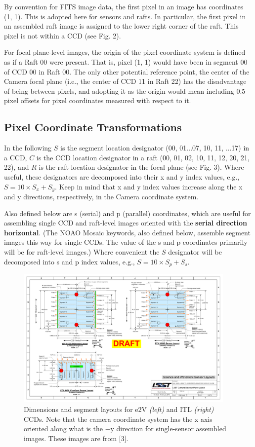 \documentclass{article}[12pt]
\begin{document}
By convention for FITS image data, the first pixel in an image has coordinates (1, 1).  This is adopted here for sensors and rafts.  In particular, the first pixel in an assembled raft image is assigned to the lower right corner of the raft.  This pixel is not within a CCD (see Fig. 2). 

For focal plane-level images, the origin of the pixel coordinate system is defined as if a Raft 00 were present.  That is, pixel (1, 1) would have been in segment 00 of CCD 00 in Raft 00.  The only other potential reference point, the center of the Camera focal plane (i.e., the center of CCD 11 in Raft 22) has the disadvantage of being between pixels, and adopting it as the origin would mean including 0.5 pixel offsets for pixel coordinates measured with respect to it.

\subsection{Pixel Coordinate Transformations}
In the following $S$ is the segment location designator (00, 01...07, 10, 11, ...17) in a CCD, $C$ is the CCD location designator in a raft (00, 01, 02, 10, 11, 12, 20, 21, 22), and $R$ is the raft location designator in the focal plane (see Fig. 3).  Where useful, these designators are decomposed into their x and y index values, e.g., $S = 10 \times S_x + S_y$.  Keep in mind that x and y index values increase along the x and y directions, respectively, in the Camera coordinate system.

Also defined below are s (serial) and p (parallel) coordinates, which are useful for assembling single CCD and raft-level images oriented with the {\bf serial direction horizontal}.  (The NOAO Mosaic keywords, also defined below, assemble segment images this way for single CCDs.  The value of the s and p coordinates primarily will be for raft-level images.)  Where convenient the $S$ designator will be decomposed into s and p index values, e.g., $S = 10 \times S_p + S_s$.

\begin{figure}
\centering
    \includegraphics[width=0.95\textwidth]{sensor_layout.pdf}
    \caption{Dimensions and segment layouts for e2V {\it (left)} and ITL {\it (right)} CCDs.  Note that the camera coordinate system has the x axis oriented along what is the $-$y direction for single-sensor assembled images.  These images are from [3].}
    \label{fig:sensor}
\end{figure}
\end{document}
